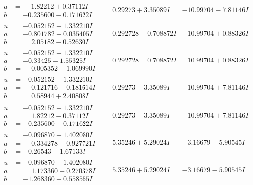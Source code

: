\documentclass[1p]{elsarticle_modified}
\theoremstyle{definition}
\begin{document}
$$\begin{array}{c|c|c}
\begin{aligned}
a &= \phantom{-}1.82212 + 0.37112 I \\
b &= -0.235600 - 0.171622 I\end{aligned}
 & \phantom{-}0.29273 + 3.35089 I & -10.99704 - 7.81146 I \\ \hline\begin{aligned}
u &= -0.052152 - 1.332210 I \\
a &= -0.801782 - 0.035405 I \\
b &= \phantom{-}2.05182 - 0.52630 I\end{aligned}
 & \phantom{-}0.292728 + 0.708872 I & -10.99704 + 0.88326 I \\ \hline\begin{aligned}
u &= -0.052152 - 1.332210 I \\
a &= -0.33425 - 1.55325 I \\
b &= \phantom{-}0.005352 - 1.069990 I\end{aligned}
 & \phantom{-}0.292728 + 0.708872 I & -10.99704 + 0.88326 I \\ \hline\begin{aligned}
u &= -0.052152 - 1.332210 I \\
a &= \phantom{-}0.121716 + 0.181614 I \\
b &= \phantom{-}0.58944 + 2.40808 I\end{aligned}
 & \phantom{-}0.29273 - 3.35089 I & -10.99704 + 7.81146 I \\ \hline\begin{aligned}
u &= -0.052152 - 1.332210 I \\
a &= \phantom{-}1.82212 - 0.37112 I \\
b &= -0.235600 + 0.171622 I\end{aligned}
 & \phantom{-}0.29273 - 3.35089 I & -10.99704 + 7.81146 I \\ \hline\begin{aligned}
u &= -0.096870 + 1.402080 I \\
a &= \phantom{-}0.334278 - 0.927721 I \\
b &= -0.26543 - 1.67133 I\end{aligned}
 & \phantom{-}5.35246 + 5.29024 I & -3.16679 - 5.90545 I \\ \hline\begin{aligned}
u &= -0.096870 + 1.402080 I \\
a &= \phantom{-}1.173360 - 0.270378 I \\
b &= -1.268360 - 0.558555 I\end{aligned}
 & \phantom{-}5.35246 + 5.29024 I & -3.16679 - 5.90545 I\\

\end{array}$$
\end{document}
